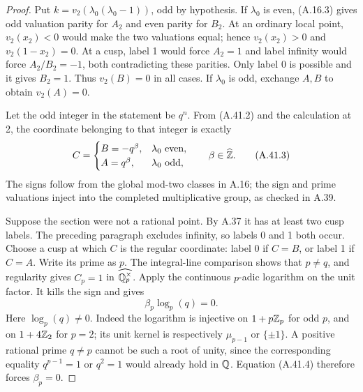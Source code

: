 \begin{proof}
Put $k=v_2(\lambda_0(\lambda_0-1))$, odd by hypothesis.  If
$\lambda_0$ is even, (A.16.3) gives odd valuation parity for $A_2$
and even parity for $B_2$.  At an ordinary local point,
$v_2(x_2)<0$ would make the two valuations equal; hence
$v_2(x_2)>0$ and $v_2(1-x_2)=0$.  At a cusp, label 1 would force
$A_2=1$ and label infinity would force $A_2/B_2=-1$, both
contradicting these parities.  Only label 0 is possible and it gives
$B_2=1$.  Thus $v_2(B)=0$ in all cases.  If $\lambda_0$ is odd,
exchange $A,B$ to obtain $v_2(A)=0$.

Let the odd integer in the statement be $q^n$.  From (A.41.2) and
the calculation at 2, the coordinate belonging to that integer is
exactly
\[
 C=\begin{cases}
       B=-q^\beta,&\lambda_0\text{ even},\\
       A= q^\beta,&\lambda_0\text{ odd},
    \end{cases}
             \qquad\beta\in\widehat{\mathbb Z}.
\tag{A.41.3}
\]
The signs follow from the global mod-two classes in A.16; the sign
and prime valuations inject into the completed multiplicative
group, as checked in A.39.

Suppose the section were not a rational point.  By A.37 it has at
least two cusp labels.  The preceding paragraph excludes infinity,
so labels 0 and 1 both occur.  Choose a cusp at which $C$ is the
regular coordinate: label 0 if $C=B$, or label 1 if $C=A$.
Write its prime as $p$.  The integral-line comparison shows that
$p\ne q$, and regularity gives $C_p=1$ in
$\widehat{\mathbb Q_p^\times}$.  Apply the continuous $p$-adic logarithm
on the unit factor.  It kills the sign and gives
\[
                         \beta_p\log_p(q)=0.
\tag{A.41.4}
\]
Here $\log_p(q)\ne0$.  Indeed the logarithm is injective on
$1+p\mathbb Z_p$ for odd $p$, and on $1+4\mathbb Z_2$ for $p=2$; its unit
kernel is respectively $\mu_{p-1}$ or $\{\pm1\}$.  A positive
rational prime $q\ne p$ cannot be such a root of unity, since the
corresponding equality $q^{p-1}=1$ or $q^2=1$ would already hold
in $\mathbb Q$.  Equation (A.41.4) therefore forces $\beta_p=0$.


\end{proof}
